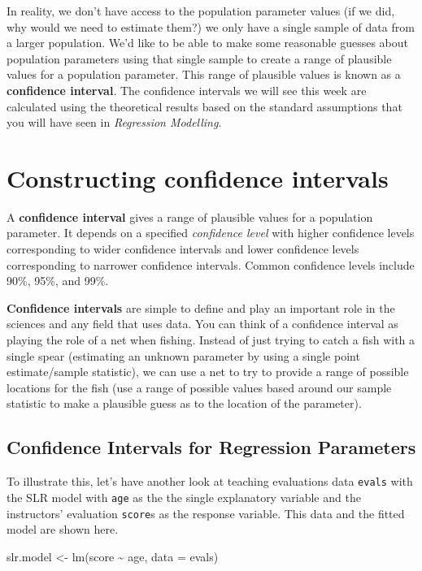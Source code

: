\documentclass[
  letterpaper,
  DIV=11,
  numbers=noendperiod]{scrartcl}
\newenvironment{Shaded}{\begin{snugshade}}{\end{snugshade}}
\newcommand{\AttributeTok}[1]{\textcolor[rgb]{0.40,0.45,0.13}{#1}}
\newcommand{\FunctionTok}[1]{\textcolor[rgb]{0.28,0.35,0.67}{#1}}
\newcommand{\NormalTok}[1]{\textcolor[rgb]{0.00,0.23,0.31}{#1}}
\newcommand{\OtherTok}[1]{\textcolor[rgb]{0.00,0.23,0.31}{#1}}
\newcommand{\SpecialCharTok}[1]{\textcolor[rgb]{0.37,0.37,0.37}{#1}}
\begin{document}
In reality, we don't have access to the population parameter values (if
we did, why would we need to estimate them?) we only have a single
sample of data from a larger population. We'd like to be able to make
some reasonable guesses about population parameters using that single
sample to create a range of plausible values for a population parameter.
This range of plausible values is known as a \textbf{confidence
interval}. The confidence intervals we will see this week are calculated
using the theoretical results based on the standard assumptions that you
will have seen in \emph{Regression Modelling}.

\section{Constructing confidence
intervals}\label{constructing-confidence-intervals}

A \textbf{confidence interval} gives a range of plausible values for a
population parameter. It depends on a specified \emph{confidence level}
with higher confidence levels corresponding to wider confidence
intervals and lower confidence levels corresponding to narrower
confidence intervals. Common confidence levels include 90\%, 95\%, and
99\%.

\textbf{Confidence intervals} are simple to define and play an important
role in the sciences and any field that uses data. You can think of a
confidence interval as playing the role of a net when fishing. Instead
of just trying to catch a fish with a single spear (estimating an
unknown parameter by using a single point estimate/sample statistic), we
can use a net to try to provide a range of possible locations for the
fish (use a range of possible values based around our sample statistic
to make a plausible guess as to the location of the parameter).

\subsection{Confidence Intervals for Regression
Parameters}\label{confidence-intervals-for-regression-parameters}

To illustrate this, let's have another look at teaching evaluations data
\texttt{evals} with the SLR model with \texttt{age} as the the single
explanatory variable and the instructors' evaluation \texttt{score}s as
the response variable. This data and the fitted model are shown here.

\begin{Shaded}
\begin{Highlighting}[]
\NormalTok{slr.model }\OtherTok{\textless{}{-}} \FunctionTok{lm}\NormalTok{(score }\SpecialCharTok{\textasciitilde{}}\NormalTok{ age, }\AttributeTok{data =}\NormalTok{ evals)}
\end{Highlighting}
\end{Shaded}
\end{document}
